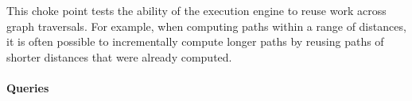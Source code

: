 
This choke point tests the ability of the execution engine to reuse work across
graph traversals. For example, when computing paths within a range of distances,
it is often possible to incrementally compute longer paths by reusing paths of
shorter distances that were already computed.


\paragraph{Queries}
{\raggedright

}